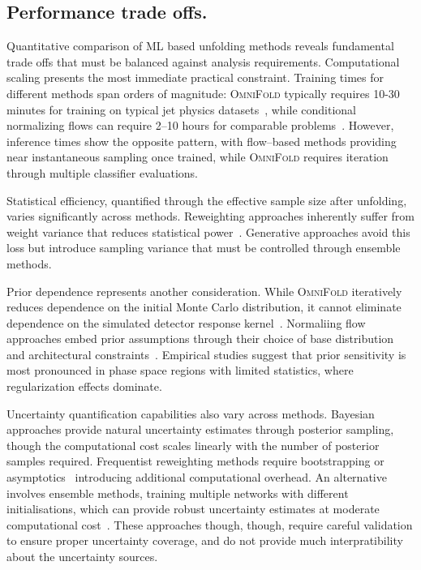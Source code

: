    \subsection{Performance trade offs.}
        Quantitative comparison of ML based unfolding methods reveals fundamental trade offs that must be balanced against analysis requirements.
        Computational scaling presents the most immediate practical constraint.
        Training times for different methods span orders of magnitude: \textsc{OmniFold} typically requires 10-30 minutes for training on typical jet physics datasets~\cite{ML4Jets2020}, while conditional normalizing flows can require 2--10 hours for comparable problems~\cite{Bellagente2020InvertibleAgain}.
        However, inference times show the opposite pattern, with flow--based methods providing near instantaneous sampling once trained, while \textsc{OmniFold} requires iteration through multiple classifier evaluations.

        Statistical efficiency, quantified through the effective sample size after unfolding, varies significantly across methods.
        Reweighting approaches inherently suffer from weight variance that reduces statistical power~\cite{collaboration_measurement_2025}.
        Generative approaches avoid this loss but introduce sampling variance that must be controlled through ensemble methods.
        
        Prior dependence represents another consideration.
        While \textsc{OmniFold} iteratively reduces dependence on the initial Monte Carlo distribution, it cannot eliminate dependence on the simulated detector response kernel~\cite{andreassen_omnifold_2020}.
        Normaliing flow approaches embed prior assumptions through their choice of base distribution and architectural constraints~\cite{papamakarios_masked_2018}.
        Empirical studies suggest that prior sensitivity is most pronounced in phase space regions with limited statistics, where regularization effects dominate.

        Uncertainty quantification capabilities also vary  across methods.
        Bayesian approaches provide natural uncertainty estimates through posterior sampling, though the computational cost scales linearly with the number of posterior samples required.
        Frequentist reweighting methods require bootstrapping or asymptotics~\cite{Cowan2011AsymptoticPhysics} introducing additional computational overhead.
        An alternative involves ensemble methods, training multiple networks with different initialisations, which can provide robust uncertainty estimates at moderate computational cost~\cite{mishra_uncertainty_2021}.
        These approaches though, though, require careful validation to ensure proper uncertainty coverage, and do not provide much interpratibility about the uncertainty sources.

